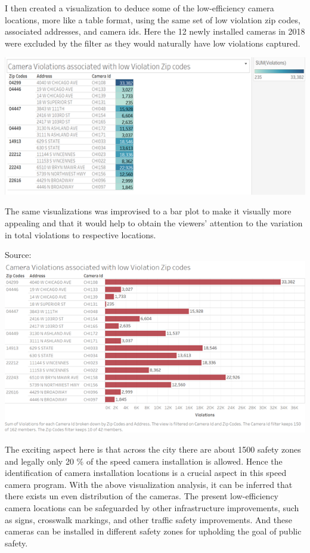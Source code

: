 \documentclass[]{book}
\begin{document}
I then created a visualization to deduce some of the low-efficiency camera locations, more like a table format, using the same set of low violation zip codes, associated addresses, and camera ids. Here the 12 newly installed cameras in 2018 were excluded by the filter as they would naturally have low violations captured.

\includegraphics{images/Image11.png}

The same visualizations was improvised to a bar plot to make it visually more appealing and that it would help to obtain the viewers' attention to the variation in total violations to respective locations.

Source:\citep{tableau}
\includegraphics{images/Image12.png}

The exciting aspect here is that across the city there are about 1500 safety zones and legally only 20 \% of the speed camera installation is allowed. Hence the identification of camera installation locations is a crucial aspect in this speed camera program. With the above visualization analysis, it can be inferred that there exists un even distribution of the cameras. The present low-efficiency camera locations can be safeguarded by other infrastructure improvements, such as signs, crosswalk markings, and other traffic safety improvements. And these cameras can be installed in different safety zones for upholding the goal of public safety.
\end{document}
